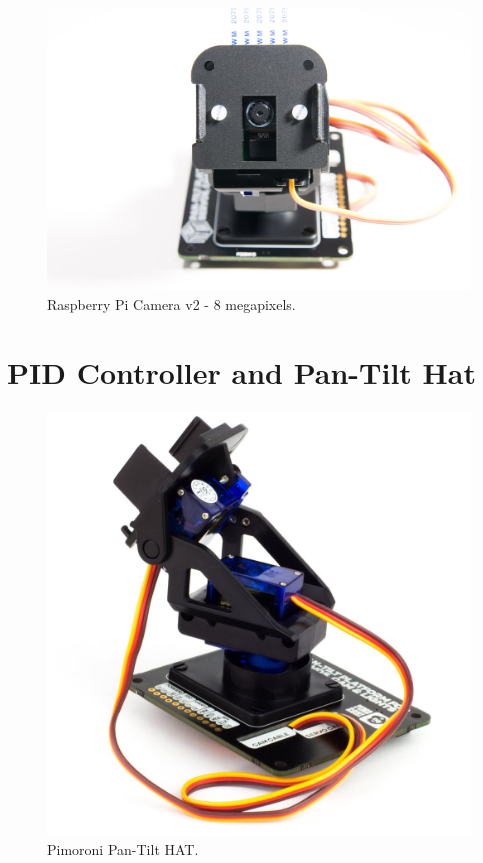 \documentclass[runningheads]{llncs}
\begin{document}
\begin{figure}
\includegraphics[width=\textwidth]{Pi-Camera.jpg}
\caption{Raspberry Pi Camera v2 - 8 megapixels.} \label{fig1}
\end{figure}

\section{PID Controller and Pan-Tilt Hat}


\begin{figure}
\includegraphics[width=\textwidth]{Pan-Tilt_HAT.jpg}
\caption{Pimoroni Pan-Tilt HAT.} \label{fig1}
\end{figure}
\end{document}
